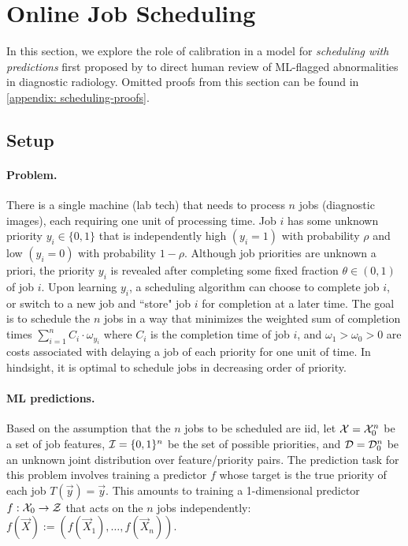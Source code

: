 \section{Online Job Scheduling}
In this section,  we explore the role of calibration in a model for \textit{scheduling with predictions} first proposed by \citet{Cho22:Scheduling} to direct 
human review of ML-flagged abnormalities in diagnostic radiology. Omitted proofs from this section can be found in \cref{appendix: scheduling-proofs}. 
\subsection{Setup}
\paragraph{Problem.} There is a single machine (lab tech) that needs to process $n$ jobs (diagnostic images), each requiring one unit of processing time. Job $i$ has some unknown priority $y_i\in\{0,1\}$ that is independently high $(y_i=1)$ with probability $\rho$ and low $(y_i=0)$ with probability $1-\rho$. Although job priorities are unknown a priori, the priority $y_i$ is revealed after completing some fixed fraction $\theta \in (0,1)$ of job $i$. Upon learning $y_i$, a scheduling algorithm can choose to complete job $i$, or switch to a new job and ``store" job $i$ for completion at a later time. The goal is to schedule the $n$ jobs in a way that minimizes the weighted sum of completion times $\sum_{i=1}^n C_i \cdot \omega_{y_i}$
where $C_i$ is the completion time of job $i$, and $\omega_1 >\omega_0 >0$ are costs associated with delaying a job of each priority for one unit of time. In hindsight, it is optimal to schedule jobs in decreasing order of priority.

\paragraph{ML predictions.}
 Based on the assumption that the $n$ jobs to be scheduled are iid, let $\mathcal{X} = \mathcal{X}_0^n$ be a set of job features, $\mathcal{I} = \{0,1\}^n$ be the set of possible priorities, and $\mathcal{D} = \mathcal{D}_0^n$ be an unknown joint distribution over feature/priority pairs. The prediction task for this problem involves training a predictor $f$ whose target is the true priority of each job $T(\vec{y}) = \vec{y}$. This amounts to training a 1-dimensional predictor $f: \mathcal{X}_0 \to \mathcal{Z}$ that acts on the $n$ jobs independently:
 $f(\vec{X}) := (f(\vec{X}_1), \dots, f(\vec{X}_n)).$
 
